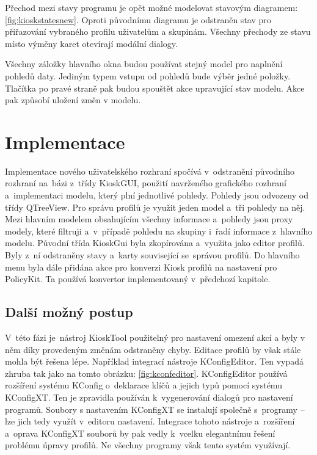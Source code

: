 Přechod mezi stavy programu je opět možné modelovat stavovým diagramem: \ref{fig:kioskstatesnew}. Oproti původnímu diagramu je odstraněn stav pro přiřazování vybraného profilu uživatelům a skupinám. Všechny přechody ze stavu  místo výměny karet otevírají modální dialogy.

Všechny záložky hlavního okna budou používat stejný model pro naplnění pohledů daty. Jediným typem vstupu od pohledů bude výběr jedné položky. Tlačítka po pravé straně pak budou spouštět akce upravující stav modelu. Akce  pak způsobí uložení změn v modelu.
\section{Implementace}
Implementace nového uživatelského rozhraní spočívá v~odstranění původního rozhraní na~bázi  z~třídy KioskGUI, použití navrženého grafického rozhraní a~implementaci modelu, který plní jednotlivé pohledy. Pohledy jsou odvozeny od třídy QTreeView. Pro správu profilů je využit jeden model a~tři pohledy na něj. Mezi hlavním modelem obsahujícím všechny informace a~pohledy jsou proxy modely, které filtruji a~v~případě pohledu na skupiny i~řadí informace z~hlavního modelu. Původní třída KioskGui byla zkopírována a~využita jako editor profilů. Byly z~ní odstraněny stavy a~karty související se~správou profilů. Do hlavního menu byla dále přidána akce pro konverzi Kiosk profilů na nastavení pro PolicyKit. Ta používá konvertor implementovaný v~předchozí kapitole.

\subsection*{Další možný postup}
V~této fázi je~nástroj KioskTool použitelný pro nastavení omezení akcí a byly v něm díky provedeným změnám odstraněny chyby. Editace profilů by však stále mohla být řešena lépe. Například integrací nástroje KConfigEditor. Ten vypadá zhruba tak jako na tomto obrázku: \ref{fig:kconfeditor}. KConfigEditor používá rozšíření systému KConfig o~deklarace klíčů a jejich typů pomocí systému KConfigXT. Ten je zpravidla používán k~vygenerování dialogů pro nastavení programů. Soubory s nastavením KConfigXT se instalují společně s~programy -- lze jich tedy využít v~editoru nastavení. Integrace tohoto nástroje a~rozšíření a~oprava KConfigXT souborů by pak vedly k~vcelku elegantnímu řešení problému úpravy profilů. Ne všechny programy však tento systém využívají.

